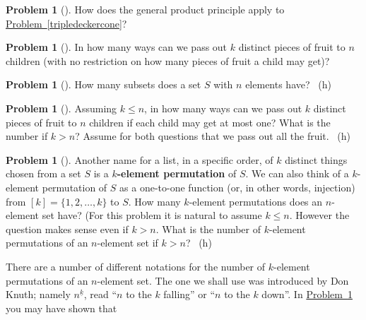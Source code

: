\documentclass[10pt,]{book}
\newcommand{\terminology}[1]{\textbf{#1}}
\theoremstyle{plain}
\theoremstyle{definition}
\newtheorem{activity}[project]{Problem}
\theoremstyle{definition}
\numberwithin{equation}{chapter}
\begin{document}
\begin{activity}[] \label{activity-16}
\hypertarget{p-106}{}%
How does the general product principle apply to \hyperref[tripledeckercone]{Problem~\ref{tripledeckercone}}?%
\end{activity}
\begin{activity}[] \label{activity-17}
\hypertarget{p-108}{}%
In how many ways can we pass out \(k\) distinct pieces of fruit to \(n\) children (with no restriction on how many pieces of fruit a child may get)?%
\end{activity}
\begin{activity}[] \label{SubsetsFirstTime}
\hypertarget{p-110}{}%
How many subsets does a set \(S\) with \(n\) elements have?%
~{\tiny (h)}\end{activity}
\begin{activity}[] \label{activity-19}
\hypertarget{p-113}{}%
Assuming \(k\le n\), in how many ways can we pass out \(k\) distinct pieces of fruit to \(n\) children if each child may get at most one? What is the number if \(k>n\)? Assume for both questions that we pass out all the fruit.%
~{\tiny (h)}\end{activity}
\begin{activity}[] \label{kelementpermutation}
\hypertarget{p-117}{}%
Another name for a list, in a specific order, of \(k\) distinct things chosen from a set \(S\) is a \terminology{\(k\)-element permutation} of \(S\). We can also think of a \(k\)-element permutation of \(S\) as a one-to-one function (or, in other words, injection) from \([k]=\{1,2,\ldots, k\}\) to \(S\). How many \(k\)-element permutations does an \(n\)-element set have? (For this problem it is natural to assume \(k\le n\). However the question makes sense even if \(k>n\). What is the number of \(k\)-element permutations of an \(n\)-element set if \(k>n\)?%
~{\tiny (h)}\end{activity}
\hypertarget{p-120}{}%
There are a number of different notations for the number of \(k\)-element permutations of an \(n\)-element set. The one we shall use was introduced by Don Knuth; namely \(n^{\underline{k}}\), read ``\(n\) to the \(k\) falling'' or ``\(n\) to the \(k\) down''. In \hyperref[kelementpermutation]{Problem~\ref{kelementpermutation}} you may have shown that%
\end{document}
